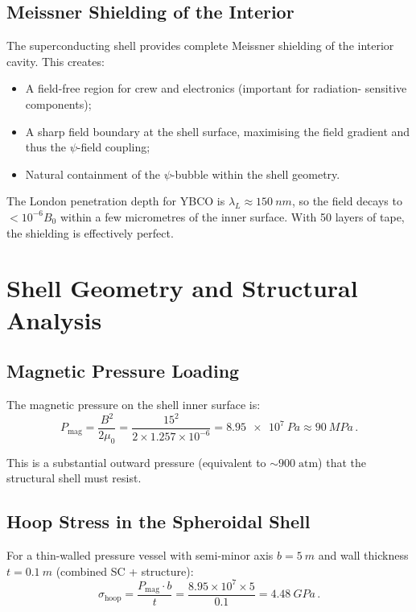 \documentclass[11pt,a4paper]{article}
\begin{document}
\subsection{Meissner Shielding of the Interior}

The superconducting shell provides complete Meissner shielding of the interior
cavity. This creates:
\begin{itemize}[nosep]
\item A field-free region for crew and electronics (important for radiation-
sensitive components);
\item A sharp field boundary at the shell surface, maximising the field
gradient and thus the $\psi$-field coupling;
\item Natural containment of the $\psi$-bubble within the shell geometry.
\end{itemize}

The London penetration depth for YBCO is $\lambda_L \approx \SI{150}{nm}$,
so the field decays to $<10^{-6} B_0$ within a few micrometres of the inner
surface. With 50 layers of tape, the shielding is effectively perfect.

\section{Shell Geometry and Structural Analysis}\label{sec:structural}

\subsection{Magnetic Pressure Loading}

The magnetic pressure on the shell inner surface is:
\begin{equation}
P_{\mathrm{mag}} = \frac{B^2}{2\mu_0} = \frac{15^2}{2 \times 1.257 \times 10^{-6}}
= \SI{8.95e7}{Pa} \approx \SI{90}{MPa}\,.
\end{equation}

This is a substantial outward pressure (equivalent to $\sim\!900\;\mathrm{atm}$)
that the structural shell must resist.

\subsection{Hoop Stress in the Spheroidal Shell}

For a thin-walled pressure vessel with semi-minor axis $b = \SI{5}{m}$ and
wall thickness $t = \SI{0.1}{m}$ (combined SC + structure):
\begin{equation}
\sigma_{\mathrm{hoop}} = \frac{P_{\mathrm{mag}} \cdot b}{t}
= \frac{8.95 \times 10^7 \times 5}{0.1} = \SI{4.48}{GPa}\,.
\end{equation}
\end{document}
